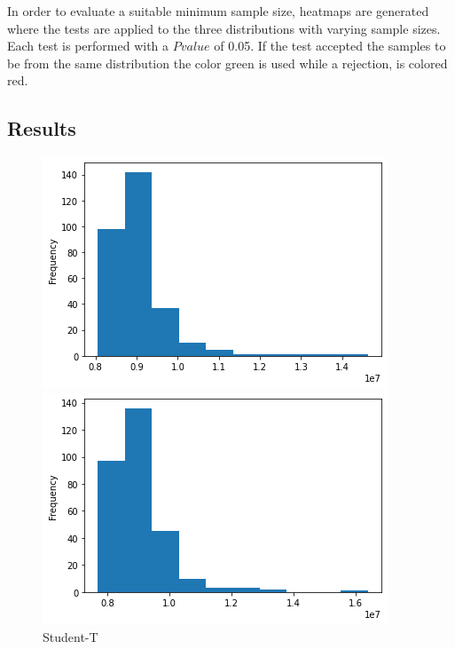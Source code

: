In order to evaluate a suitable minimum sample size, heatmaps are generated where the tests are applied to the three distributions with varying sample sizes. Each test is performed with a \(P value\) of 0.05. If the test accepted the samples to be from the same distribution the color green is used while a rejection, is colored red.

\subsection{Results}

\begin{figure}[htb]
  \centering
  \includegraphics[width=\linewidth]{./img/histogram_deepar_electricity_statistics_300_samples.png}
  \caption{Student-T}
  \label{deepar_student_t_distibution}
  \endminipage\hfill
  \includegraphics[width=\linewidth]{./img/histogram_deepar_negbin_electricity_statistics_200_samples.png}

\end{figure}
